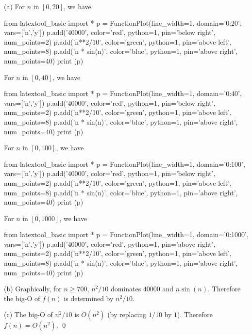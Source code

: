 (a)
For $n$ in $[0,20]$, we have
\begin{python}
from latextool_basic import *
p = FunctionPlot(line_width=1, domain='0:20', vars=['n','y'])
p.add('40000', color='red', python=1, pin='below right', num_points=2)
p.add('n**2/10', color='green', python=1, pin='above left', num_points=8)
p.add('n * sin(n)', color='blue', python=1, pin='above right', num_points=40)
print (p)
\end{python}
For $n$ in $[0,40]$, we have
\begin{python}
from latextool_basic import *
p = FunctionPlot(line_width=1, domain='0:40', vars=['n','y'])
p.add('40000', color='red', python=1, pin='below right', num_points=2)
p.add('n**2/10', color='green', python=1, pin='above left', num_points=8)
p.add('n * sin(n)', color='blue', python=1, pin='above right', num_points=40)
print (p)
\end{python}
For $n$ in $[0,100]$, we have
\begin{python}
from latextool_basic import *
p = FunctionPlot(line_width=1, domain='0:100', vars=['n','y'])
p.add('40000', color='red', python=1, pin='below right', num_points=2)
p.add('n**2/10', color='green', python=1, pin='above left', num_points=8)
p.add('n * sin(n)', color='blue', python=1, pin='above right', num_points=40)
print (p)
\end{python}
For $n$ in $[0,1000]$, we have
\begin{python}
from latextool_basic import *
p = FunctionPlot(line_width=1, domain='0:1000', vars=['n','y'])
p.add('40000', color='red', python=1, pin='above right', num_points=2)
p.add('n**2/10', color='green', python=1, pin='above left', num_points=8)
p.add('n * sin(n)', color='blue', python=1, pin='above right', num_points=40)
print (p)
\end{python}

(b)
Graphically,
for $n \geq 700$, $n^2/10$ dominates $40000$ and $n \sin (n)$.
Therefore the big-O of $f(n)$ is determined by $n^2/10$.

(c)
The big-O of $n^2/10$ is $O(n^2)$ (by replacing $1/10$ by $1$).
Therefore $f(n) = O(n^2)$.
\qed

